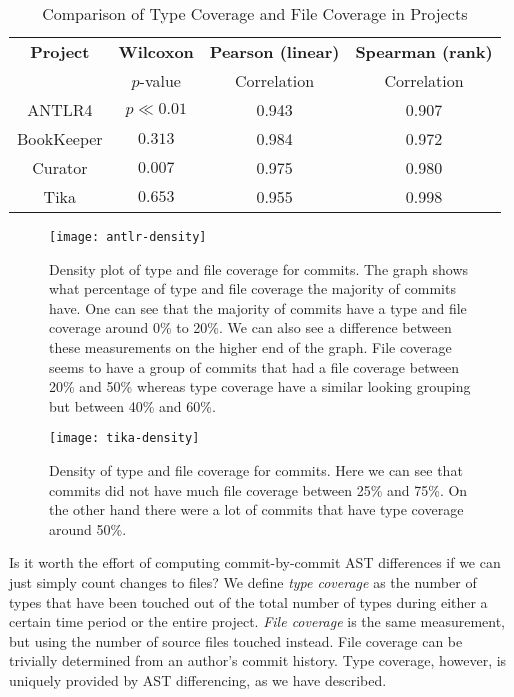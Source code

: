 \begin{table}[ht]
\renewcommand{\arraystretch}{1.3}
\caption{Comparison of Type Coverage and File Coverage in Projects}
\label{tab:summary}
\centering
\begin{tabular}{c|ccc}
\hline
\bfseries Project & \bfseries Wilcoxon& \bfseries Pearson (linear) & \bfseries Spearman (rank) \\
& $p$-value & Correlation & Correlation \\
\hline
ANTLR4 & $p\ll0.01$ & 0.943 & 0.907\\
BookKeeper & $0.313$ & 0.984 & 0.972\\
Curator & $0.007$ & 0.975 & 0.980\\
Tika & $0.653$ & 0.955 & 0.998\\
\hline
\end{tabular}
\end{table}

\begin{figure}[ht]
\centering
\texttt{[image: antlr-density]}
\caption{Density plot of type and file coverage for commits. The graph shows what percentage of type and file coverage the majority of commits have. One can see that the majority of commits have a type and file coverage around 0\% to 20\%. We can also see a difference between these measurements on the higher end of the graph. File coverage seems to have a group of commits that had a file coverage between 20\% and 50\% whereas type coverage have a similar looking grouping but between 40\% and 60\%.\label{fig:antlr4-density}}
\end{figure}

\begin{figure}[ht]
\centering
\texttt{[image: tika-density]}
\caption{Density of type and file coverage for commits. Here we can see that commits did not have much file coverage between 25\% and 75\%. On the other hand there were a lot of commits that have type coverage around 50\%.\label{fig:tika-density}}
\end{figure}

Is it worth the effort of computing commit-by-commit AST differences if we can just simply count changes to files? We define \emph{type coverage} as the number of types that have been touched out of the total number of types during either a certain time period or the entire project. \emph{File coverage} is the same measurement, but using the number of source files touched instead. File coverage can be trivially determined from an author's commit history. Type coverage, however, is uniquely provided by AST differencing, as we have described.


